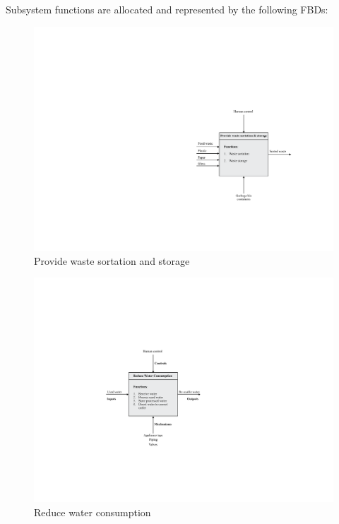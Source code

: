 \documentclass[a4paper,11pt,fleqn]{report}
\begin{document}
Subsystem functions are allocated and represented by the following \ac{FBD}s:\\
%
\begin{figure}[h!]
\begin{center}
\includegraphics[scale = 0.7]{Function1.pdf}
\caption{Provide waste sortation and storage}
\label{fig: Function1}
\end{center}
\end{figure}
%
\begin{figure}[h!]
\begin{center}
\includegraphics[scale = 0.7]{Function2.pdf}
\caption{Reduce water consumption}
\label{fig: Function2}
\end{center}
\end{figure}
\end{document}
